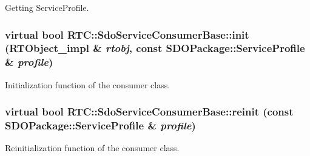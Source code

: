 Getting ServiceProfile. 

\subsubsection[{init}]{\setlength{\rightskip}{0pt plus 5cm}virtual bool RTC::SdoServiceConsumerBase::init ({\bf RTObject\_\-impl} \& {\em rtobj}, \/  const SDOPackage::ServiceProfile \& {\em profile})\hspace{0.3cm}{\ttfamily  [pure virtual]}}\label{classRTC_1_1SdoServiceConsumerBase_a9e454d76db971863a7498dce52acd26c}


Initialization function of the consumer class. 

\subsubsection[{reinit}]{\setlength{\rightskip}{0pt plus 5cm}virtual bool RTC::SdoServiceConsumerBase::reinit (const SDOPackage::ServiceProfile \& {\em profile})\hspace{0.3cm}{\ttfamily  [pure virtual]}}\label{classRTC_1_1SdoServiceConsumerBase_a422e9ad09cea8a41f3dcb077a71915df}


Reinitialization function of the consumer class. 

